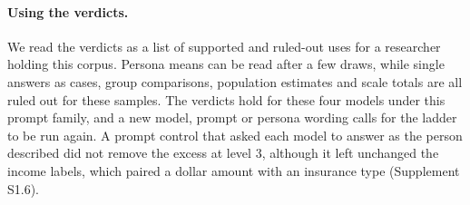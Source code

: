 \paragraph{Using the verdicts.}
We read the verdicts as a list of supported and ruled-out uses for a researcher holding this corpus.
Persona means can be read after a few draws, while single answers as cases, group comparisons, population estimates and scale totals are all ruled out for these samples.
The verdicts hold for these four models under this prompt family, and a new model, prompt or persona wording calls for the ladder to be run again.
A prompt control that asked each model to answer as the person described did not remove the excess at level 3, although it left unchanged the income labels, which paired a dollar amount with an insurance type (Supplement S1.6). %

